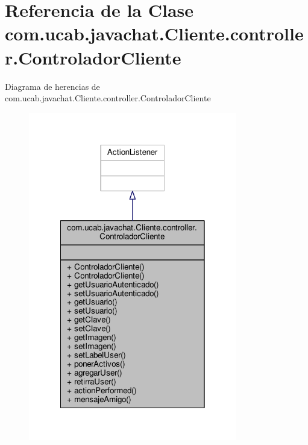 \hypertarget{classcom_1_1ucab_1_1javachat_1_1_cliente_1_1controller_1_1_controlador_cliente}{\section{Referencia de la Clase com.\-ucab.\-javachat.\-Cliente.\-controller.\-Controlador\-Cliente}
\label{classcom_1_1ucab_1_1javachat_1_1_cliente_1_1controller_1_1_controlador_cliente}
}


Diagrama de herencias de com.\-ucab.\-javachat.\-Cliente.\-controller.\-Controlador\-Cliente\nopagebreak
\begin{figure}[H]
\begin{center}
\leavevmode
\includegraphics[width=258pt]{classcom_1_1ucab_1_1javachat_1_1_cliente_1_1controller_1_1_controlador_cliente__inherit__graph}
\end{center}
\end{figure}


